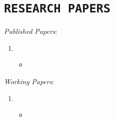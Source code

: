 \documentclass{cls/Curriculum_Vitae_Class}
\begin{document}
\section{\texttt{RESEARCH PAPERS}}
\textit{Published Papers}:
	\begin{enumerate}
		\item {}
		\begin{itemize}
			\item[] \\
		\end{itemize}
	\end{enumerate}
\textit{Working Papers}:
	\begin{enumerate}
		\item {}
		\begin{itemize}
			\item[] \\~\\
		\end{itemize}
	\end{enumerate}


\end{document}
